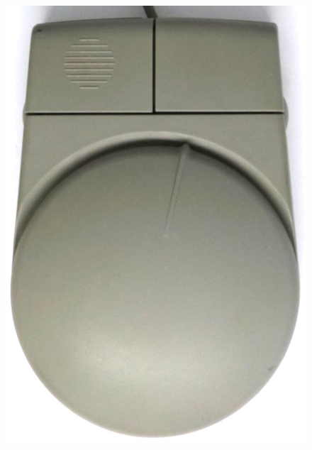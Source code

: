 \documentclass[11pt, a4paper]{article}
\begin{document}
\begin{figure}[h]
    \centering
    \includegraphics[scale=0.6]{1987_sharp_convertible/top_30.jpg}

\end{figure}
\end{document}
